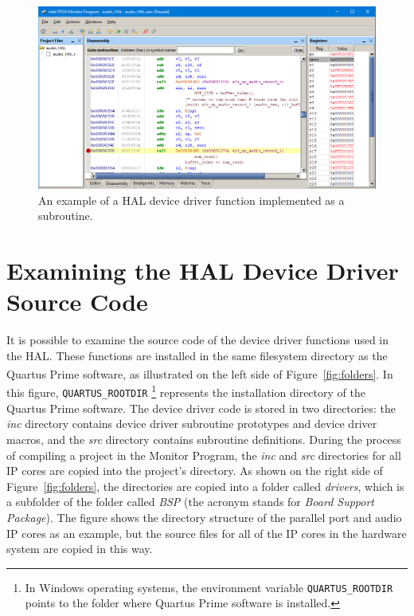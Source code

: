 \documentclass[11pt, twoside, pdftex]{article}
\begin{document}
\begin{figure}[h!]
	\begin{center}
		\includegraphics[width=5.75in]{figures/HAL_debug_sub.png}
	\end{center}
	\caption{An example of a HAL device driver function implemented as a subroutine.} 
	\label{fig:HAL_debug_sub}
\end{figure}

\section{Examining the HAL Device Driver Source Code}

It is possible to examine the source code of the device driver functions used in the HAL. These functions are installed
in the same filesystem directory as the Quartus\textsuperscript{\textregistered} Prime software, as illustrated on the left side of Figure~\ref{fig:folders}.
In this figure, \texttt{QUARTUS\_ROOTDIR} \footnote{In Windows operating systems, the environment variable 
\texttt{QUARTUS\_ROOTDIR} points to the folder where Quartus Prime software is installed.} represents the installation 
directory of the Quartus Prime software. The device driver code is stored in two directories: the {\it inc} directory contains 
device driver subroutine prototypes and device driver macros, and the {\it src} directory contains subroutine definitions. 
During the process of compiling a project in the Monitor Program, the {\it inc} and {\it src} directories for all IP cores
are copied into the project's directory. As shown on the right side of Figure~\ref{fig:folders}, the directories 
are copied into a folder called {\it drivers}, which is a subfolder of the folder called {\it BSP} (the acronym stands
for {\it Board Support Package}). The figure shows the directory structure of the parallel port and audio IP cores
as an example, but the source files for all of the IP cores in the hardware system are copied in this way.
\end{document}
